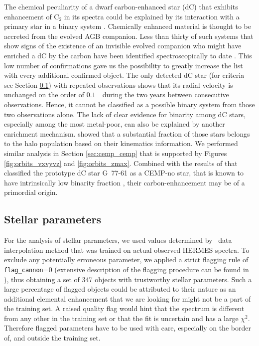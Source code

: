 The chemical peculiarity of a dwarf carbon-enhanced star (dC) that exhibits enhancement of C$_2$ in its spectra could be explained by its interaction with a primary star in a binary system \cite{2018ApJ...856L...2M}. Chemically enhanced material is thought to be accreted from the evolved AGB companion. Less than thirty of such systems that show signs of the existence of an invisible evolved companion who might have enriched a dC by the carbon have been identified spectroscopically to date \cite{1986ApJ...300..314D, 2018ApJ...856L...2M, 2018MNRAS.479.3873W}. This low number of confirmations gave us the possibility to greatly increase the list with every additional confirmed object. The only detected dC star (for criteria see Section \ref{sec:cannon_params}) with repeated observations shows that its radial velocity is unchanged on the order of $0.1$~\kms\ during the two years between consecutive observations. Hence, it cannot be classified as a possible binary system from those two observations alone. The lack of clear evidence for binarity among dC stars, especially among the most metal-poor, can also be explained by another enrichment mechanism. \citet{2018MNRAS.477.3801F} showed that a substantial fraction of those stars belongs to the halo population based on their kinematics information. We performed similar analysis in Section \ref{sec:cemp_cemp} that is supported by Figures \ref{fig:orbits_vxvyvz} and \ref{fig:orbits_zmax}. Combined with the results of \citet{2016ApJ...833...20Y} that classified the prototype dC star \mbox{G 77-61} as a CEMP-no star, that is known to have intrinsically low binarity fraction \cite{2014MNRAS.441.1217S, 2016A&A...586A.160H}, their carbon-enhancement may be of a primordial origin.

\subsection{Stellar parameters}
\label{sec:cannon_params}
For the analysis of stellar parameters, we used values determined by \TC\ data interpolation method that was trained on actual observed HERMES spectra. To exclude any potentially erroneous parameter, we applied a strict flagging rule of \texttt{flag\_cannon}=0 (extensive description of the flagging procedure can be found in \citet{buder2018}), thus obtaining a set of 347 objects with trustworthy stellar parameters. Such a large percentage of flagged objects could be attributed to their nature as an additional elemental enhancement that we are looking for might not be a part of the training set. A raised quality flag would hint that the spectrum is different from any other in the training set or that the fit is uncertain and has a large $\chi^2$. Therefore flagged parameters have to be used with care, especially on the border of, and outside the training set.

